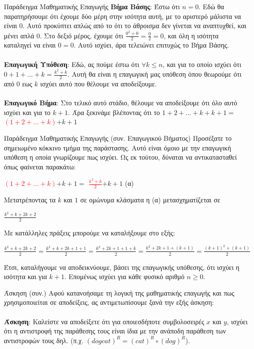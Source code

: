 \documentclass[size=14pt, paper=smartboard, style=fyma, mode=present]{powerdot}
\begin{document}
\begin{slide}[toc=]{Παράδειγμα Μαθηματικής Επαγωγής}
	{\large \textbf{Βήμα Βάσης}: Έστω ότι $n=0$. Εδώ θα παρατηρήσουμε ότι έχουμε δύο μέρη στην ισότητα αυτή, με το αριστερό μάλιστα να είναι 0. Αυτό προκύπτει απλώς από το ότι το άθροισμα δεν γίνεται να αναπτυχθεί, και μένει απλά 0. Στο δεξιό μέρος, έχουμε ότι $\frac{0^2+0}{2}=\frac{0}{2}=0$, και όλη η ισότητα καταληγεί να είναι $0=0$. Αυτό ισχύει, άρα τελειώνει επιτυχώς το Βήμα Βάσης. }
	\\~\\
	{\large \textbf{Επαγωγική Υπόθεση}: Εδώ, ας πούμε έστω ότι $\forall k \le n$, και για το οποίο ισχύει ότι $0+1+...+k=\frac{k^2+k}{2}$. Αυτή θα είναι η επαγωγική μας υπόθεση όπου θεωρούμε ότι από 0 εως $k$ ισχύει αυτό που θέλουμε να αποδείξουμε.
	}
	\\~\\
	{\large \textbf{Επαγωγικό Βήμα}: Στο τελικό αυτό στάδιο, θέλουμε να αποδείξουμε ότι όλο αυτό ισχύει και για το $k+1$. Άρα ξεκινάμε βλέποντας ότι το $1+2+...+k+k+1 = $\boldmath\textcolor{red}{$(1+2+...+k)$}\unboldmath$   + k + 1$
	}
\end{slide}
\begin{slide}[toc=]{Παράδειγμα Μαθηματικής Επαγωγής}
	(συν. Επαγωγικού Βήματος) Προσέξατε το σημειωμένο κόκκινο τμήμα της παράστασης. Αυτό είναι όμοιο με την επαγωγική υπόθεση η οποία γνωρίζουμε πως ισχύει. Ως εκ τούτου, δύναται να αντικατασταθεί όπως φαίνεται παρακάτω:
	\begin{center}
	\boldmath\textcolor{red}{$(1+2+...+k)$}\unboldmath$   + k + 1=$
	\boldmath\textcolor{red}{$\frac{k^2+k}{2}$}\unboldmath$   + k + 1$ (α)	
	\end{center}
Μετατρέποντας τα $k$ και $1$ σε ομώνυμα κλάσματα η (α) μετασχηματίζεται σε
\begin{center}
	{\Large $\frac{k^2+k+2k+2}{2}$}
\end{center}
Με κατάλληλες πράξεις μπορούμε να καταλήξουμε στο εξής:
\begin{center}
	{\Large $\frac{k^2+k+2k+2}{2}= \frac{k^2+k+2k+1+1}{2} = \frac{k^2+2k+1+1+k}{2} = \frac{k^2+2k+1+(k+1)}{2} = \frac{(k+1)^2+(k+1)}{2}$}
\end{center}
Έτσι, καταλήγουμε να αποδεικνύουμε, βάσει της επαγωγικής υπόθεσης, ότι ισχύει η ισότητα και για $k+1$. Επομένως ισχύει για κάθε φυσικό αριθμό $n\ge0$.
\end{slide}
\begin{slide}[toc={Έννοιες στη Θεωρία Υπολογισμού ΙΙ}]{Άσκηση (συν.)}
{\large 	Αφού κατανοήσαμε τη λογική της μαθηματικής επαγωγής και πως χρησιμοποιείται σε αποδείξεις, ας αντιμετωπίσουμε ξανά την εξής άσκηση: \\~\\
	\textbf{Άσκηση}: Καλείστε να αποδείξετε ότι για οποιεσδήποτε συμβολοσειρές $x$ και $y$, ισχύει ότι η αντιστροφή της παράθεσης τους είναι ίδια με την ανάποδη παράθεση των αντιστροφών τους δηλ.  \unboldmath (π.χ. $(dogcat)^R = (cat)^R \circ (dog)^R$).}	
\end{slide}
\end{document}
